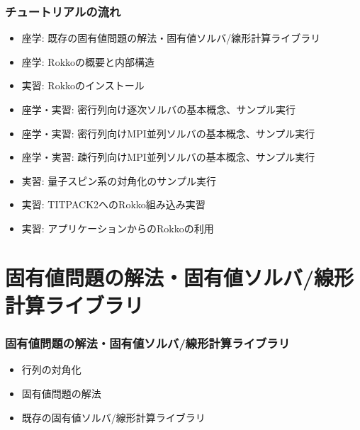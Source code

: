 \begin{frame}
  \frametitle{チュートリアルの流れ}
  \begin{itemize}
  \item 座学: 既存の固有値問題の解法・固有値ソルバ/線形計算ライブラリ
  \item 座学: Rokkoの概要と内部構造
  \item 実習: Rokkoのインストール
  \item 座学・実習: 密行列向け逐次ソルバの基本概念、サンプル実行
  \item 座学・実習: 密行列向けMPI並列ソルバの基本概念、サンプル実行
  \item 座学・実習: 疎行列向けMPI並列ソルバの基本概念、サンプル実行
  \item 実習: 量子スピン系の対角化のサンプル実行
  \item 実習: TITPACK2へのRokko組み込み実習
  \item 実習: アプリケーションからのRokkoの利用
  \end{itemize}
\end{frame}


\section{固有値問題の解法・固有値ソルバ/線形計算ライブラリ}

\begin{frame}
  \frametitle{固有値問題の解法・固有値ソルバ/線形計算ライブラリ}
  \begin{itemize}
    \setlength{\itemsep}{1em}
  \item 行列の対角化
  \item 固有値問題の解法
  \item 既存の固有値ソルバ/線形計算ライブラリ
  \end{itemize}
\end{frame}

